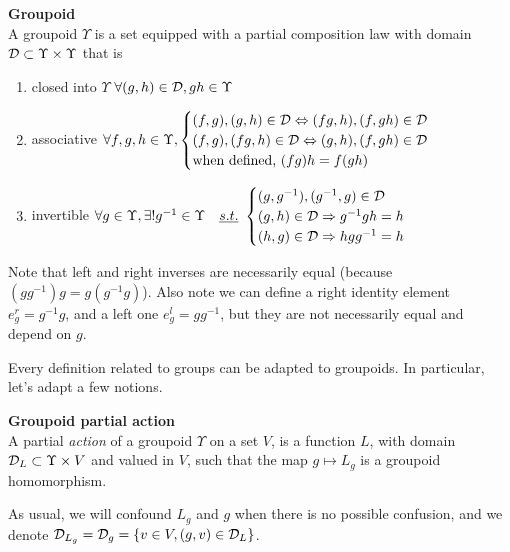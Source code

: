 \begin{definition}\textbf{Groupoid}\\
A groupoid $\Upsilon$ is a set equipped with a partial composition law with domain $\mathcal{D} \subset \Upsilon \times \Upsilon$ that is
\begin{enumerate}
	\item closed into $\Upsilon$ \ie $\forall (g, h) \in \mathcal{D}, gh \in \Upsilon$
	\item associative \ie
    $\forall f,g,h \in \Upsilon,
      \begin{cases}
        (f, g), (g, h) \in \mathcal{D} \Leftrightarrow (fg,h), (f, gh) \in \mathcal{D}\\
        (f, g), (fg, h) \in \mathcal{D} \Leftrightarrow (g,h), (f, gh) \in \mathcal{D}\\
        \text{when defined, } (fg)h = f(gh)
      \end{cases}$ \label{enum:2}
	\item invertible \ie
		$\forall g \in \Upsilon, \exists! g^{-1} \in \Upsilon \quad\emph{s.t.}~
			\begin{cases}
				(g,g^{-1}), (g^{-1},g)  \in \mathcal{D}\\
				(g,h) \in \mathcal{D} \Rightarrow g^{-1}gh = h\\
				(h,g) \in \mathcal{D} \Rightarrow hgg^{-1} = h
			\end{cases}$
\end{enumerate}
\end{definition}

\begin{remark}
Note that left and right inverses are necessarily equal (because $(gg^{-1})g=g(g^{-1}g)$). Also note we can define a right identity element $e^r_g = g^{-1}g$, and a left one $e^l_g = gg^{-1}$, but they are not necessarily equal and depend on $g$.
\end{remark}

Every definition related to groups can be adapted to groupoids. In particular, let's adapt a few notions.

\begin{definition}\textbf{Groupoid partial action}\\
A partial \emph{action} of a groupoid $\Upsilon$ on a set $V$, is a function $L$, with domain $\mathcal{D}_L \subset \Upsilon \times V$ and valued in $V$, such that the map $g \mapsto L_g$ is a groupoid homomorphism.
\end{definition}

\begin{remark}
As usual, we will confound $L_g$ and $g$ when there is no possible confusion, and we denote $\mathcal{D}_{L_g} = \mathcal{D}_g = \{ v \in V, (g,v) \in \mathcal{D}_L \}$.
\end{remark}

